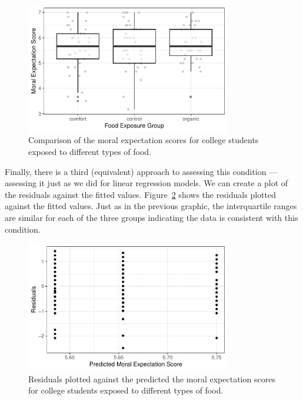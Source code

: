 \documentclass[
  letterpaper,
  DIV=11,
  numbers=noendperiod]{scrreprt}
\theoremstyle{definition}
\theoremstyle{definition}
\theoremstyle{plain}
\theoremstyle{remark}
\begin{document}
\begin{figure}

{\centering \includegraphics[width=0.8\textwidth,height=\textheight]{./images/fig-anovaassessment-variance-organic-alt-1.pdf}

}

\caption{\label{fig-anovaassessment-variance-organic-alt}Comparison of
the moral expectation scores for college students exposed to different
types of food.}

\end{figure}

Finally, there is a third (equivalent) approach to assessing this
condition --- assessing it just as we did for linear regression models.
We can create a plot of the residuals against the fitted values.
Figure~\ref{fig-anovaassessment-variance-organic-alt2} shows the
residuals plotted against the fitted values. Just as in the previous
graphic, the interquartile ranges are similar for each of the three
groups indicating the data is consistent with this condition.

\begin{figure}

{\centering \includegraphics[width=0.8\textwidth,height=\textheight]{./images/fig-anovaassessment-variance-organic-alt2-1.pdf}

}

\caption{\label{fig-anovaassessment-variance-organic-alt2}Residuals
plotted against the predicted the moral expectation scores for college
students exposed to different types of food.}

\end{figure}
\end{document}
